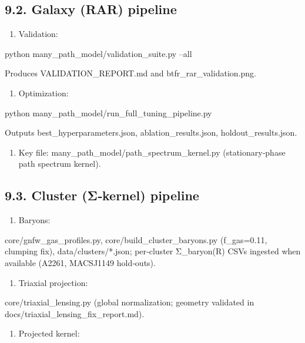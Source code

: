 \documentclass[11pt,a4paper]{article}
\begin{document}
\subsection{9.2. Galaxy (RAR) pipeline}


\begin{enumerate}
\item Validation:
\end{enumerate}

python many\_path\_model/validation\_suite.py --all  

Produces VALIDATION\_REPORT.md and btfr\_rar\_validation.png.


\begin{enumerate}
\item Optimization:
\end{enumerate}

python many\_path\_model/run\_full\_tuning\_pipeline.py  

Outputs best\_hyperparameters.json, ablation\_results.json, holdout\_results.json.


\begin{enumerate}
\item Key file: many\_path\_model/path\_spectrum\_kernel.py (stationary‑phase path spectrum kernel).
\end{enumerate}


\subsection{9.3. Cluster (Σ‑kernel) pipeline}


\begin{enumerate}
\item Baryons:
\end{enumerate}

core/gnfw\_gas\_profiles.py, core/build\_cluster\_baryons.py (f\_gas=0.11, clumping fix), data/clusters/*.json; per‑cluster Σ\_baryon(R) CSVs ingested when available (A2261, MACSJ1149 hold‑outs).


\begin{enumerate}
\item Triaxial projection:
\end{enumerate}

core/triaxial\_lensing.py (global normalization; geometry validated in docs/triaxial\_lensing\_fix\_report.md).


\begin{enumerate}
\item Projected kernel:
\end{enumerate}
\end{document}
